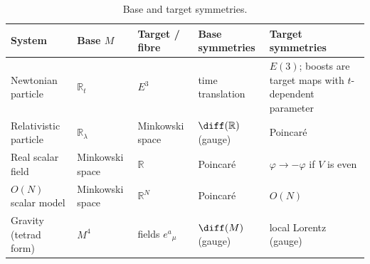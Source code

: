 \begin{table}[ht]
\centering
\footnotesize
\renewcommand{\arraystretch}{1.3}
\setlength{\tabcolsep}{3pt}
\begin{tabular}{@{}>{\raggedright\arraybackslash}p{3.0cm}%
                  >{\raggedright\arraybackslash}p{2.1cm}%
                  >{\raggedright\arraybackslash}p{2.4cm}%
                  >{\raggedright\arraybackslash}p{3.0cm}%
                  >{\raggedright\arraybackslash}p{3.6cm}@{}}
\toprule
System & Base $M$ & Target / fibre & Base symmetries & Target symmetries\\
\midrule
Newtonian particle & $\mathbb R_t$ & $E^3$ & time translation
  & $E(3)$; boosts are target maps with $t$-dependent parameter\\
Relativistic particle & $\mathbb R_\lambda$ & Minkowski space
  & $\diff(\mathbb R)$ (gauge) & Poincar\'e\\
Real scalar field & Minkowski space & $\mathbb R$ & Poincar\'e
  & $\varphi\to-\varphi$ if $V$ is even\\
$O(N)$ scalar model & Minkowski space & $\mathbb R^N$ & Poincar\'e & $O(N)$\\
Gravity (tetrad form) & $M^4$ & fields $e^a{}_\mu$ & $\diff(M)$ (gauge)
  & local Lorentz (gauge)\\
\bottomrule
\end{tabular}
\caption{Base and target symmetries.}
\label{tab:base-target}
\end{table}


